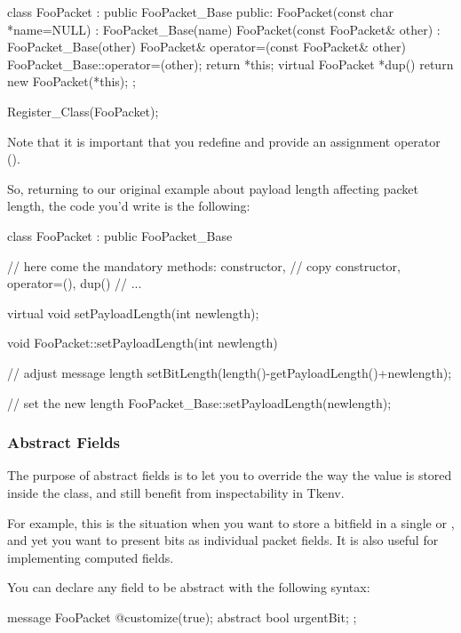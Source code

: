 \begin{cpp}
class FooPacket : public FooPacket_Base
{
  public:
    FooPacket(const char *name=NULL) : FooPacket_Base(name) {}
    FooPacket(const FooPacket& other) : FooPacket_Base(other) {}
    FooPacket& operator=(const FooPacket& other)
        {FooPacket_Base::operator=(other); return *this;}
    virtual FooPacket *dup() {return new FooPacket(*this);}
};

Register_Class(FooPacket);
\end{cpp}

Note that it is important that you redefine  and
provide an assignment operator ().

So, returning to our original example about payload length
affecting packet length, the code you'd write is the following:

\begin{cpp}
class FooPacket : public FooPacket_Base
{
    // here come the mandatory methods: constructor,
    // copy constructor, operator=(), dup()
    // ...

    virtual void setPayloadLength(int newlength);
}

void FooPacket::setPayloadLength(int newlength)
{
    // adjust message length
    setBitLength(length()-getPayloadLength()+newlength);

    // set the new length
    FooPacket_Base::setPayloadLength(newlength);
}
\end{cpp}



\subsubsection{Abstract Fields}

The purpose of abstract fields is to let you to override
the way the value is stored inside the class,
and still benefit from inspectability in Tkenv.

For example, this is the situation when you want to store a bitfield
in a single  or , and yet you want
to present bits as individual packet fields.
It is also useful for implementing computed fields.

You can declare any field to be abstract with the following syntax:

\begin{msg}
message FooPacket
{
   @customize(true);
   abstract bool urgentBit;
};
\end{msg}

